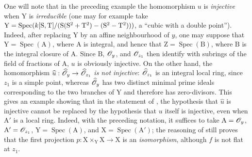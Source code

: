\begin{env}[11.7.4]
\label{IV.11.7.4}
One will note that in the preceding example the homomorphism $u$ is \emph{injective} when $\mathrm{Y}$ is \emph{irreducible} (one may for example take $\mathrm{Y}=\operatorname{Spec}(k[\mathrm{S},\mathrm{T}]/(\mathrm{S}(\mathrm{S}^2+\mathrm{T}^2)-(\mathrm{S}^2-\mathrm{T}^2)))$, a ``cubic with a double point''). Indeed, after replacing $\mathrm{Y}$ by an affine neighbourhood of $y$, one may suppose that $\mathrm{Y}=\operatorname{Spec}(\mathrm{A})$, where $\mathrm{A}$ is integral, and hence that $\mathrm{Z}=\operatorname{Spec}(\mathrm{B})$, where $\mathrm{B}$ is the integral closure of $\mathrm{A}$. Since $\mathrm{B}$, $\mathscr{O}_y$, and $\mathscr{O}_{z_1}$ then identify with subrings of
the field of fractions of $\mathrm{A}$, $u$ is obviously injective.
On the other hand, the homomorphism $\widehat{u}:\widehat{\mathscr{O}}_y\to\widehat{\mathscr{O}}_{z_1}$ \emph{is not injective}: $\widehat{\mathscr{O}}_{z_1}$ is an integral local ring, since $z_1$ is a simple point, whereas $\widehat{\mathscr{O}}_y$ has two distinct minimal prime ideals corresponding to the two branches of $\mathrm{Y}$ and therefore has zero-divisors.
This gives an example showing that in the statement of , the hypothesis that $\widehat{u}$ is injective cannot be replaced by the hypothesis that $u$ itself is injective, even when $\mathrm{A}'$ is a local ring.
Indeed, with the preceding notation, it suffices to take $\mathrm{A}=\mathscr{O}_y$, $\mathrm{A}'=\mathscr{O}_{z_1}$, $\mathrm{Y}=\operatorname{Spec}(\mathrm{A})$, and $\mathrm{X}=\operatorname{Spec}(\mathrm{A}')$; the reasoning of  still proves that the first projection $p:\mathrm{X}\times_\mathrm{Y}\mathrm{X}\to\mathrm{X}$ is an \emph{isomorphism}, although $f$ is not flat at $z_1$.
\end{env}

